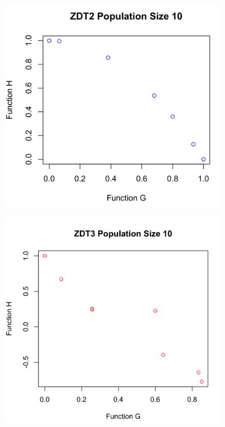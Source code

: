 \documentclass[a4paper,12pt]{article}
\begin{document}
\begin{figure}[h]
\centering
\begin{minipage}{.5\textwidth}
  \centering
  \includegraphics[width=.8\linewidth]{q1graphs/zdt2_10.png}
  \label{fig:zdt210}
\end{minipage}%
\begin{minipage}{.5\textwidth}
  \centering
  \includegraphics[width=.8\linewidth]{q1graphs/zdt3_10.png}
  \label{fig:zdt310}
\end{minipage}
\end{figure}
\end{document}
